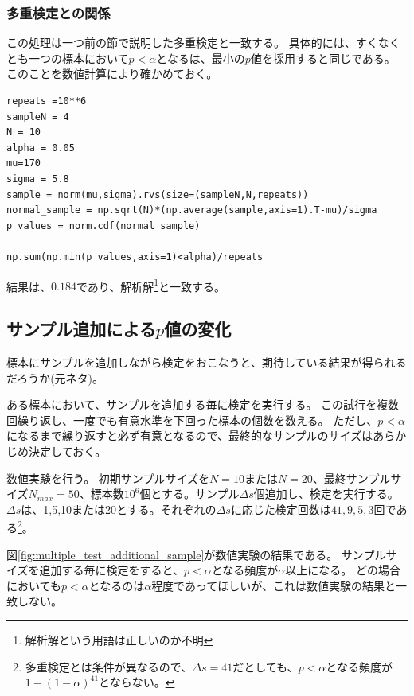 \subsubsection{多重検定との関係}
この処理は一つ前の節で説明した多重検定と一致する。
具体的には、すくなくとも一つの標本において$p<\alpha$となるは、最小の$p$値を採用すると同じである。
このことを数値計算により確かめておく。
\begin{lstlisting}
repeats =10**6
sampleN = 4
N = 10
alpha = 0.05
mu=170
sigma = 5.8
sample = norm(mu,sigma).rvs(size=(sampleN,N,repeats))
normal_sample = np.sqrt(N)*(np.average(sample,axis=1).T-mu)/sigma
p_values = norm.cdf(normal_sample)

np.sum(np.min(p_values,axis=1)<alpha)/repeats
\end{lstlisting}
結果は、$0.184$であり、解析解\footnote{解析解という用語は正しいのか不明}と一致する。



\subsection{サンプル追加による$p$値の変化}
標本にサンプルを追加しながら検定をおこなうと、期待している結果が得られるだろうか(元ネタ\cite{simmons2016false})。

ある標本において、サンプルを追加する毎に検定を実行する。
この試行を複数回繰り返し、一度でも有意水準を下回った標本の個数を数える。
ただし、$p<\alpha$になるまで繰り返すと必ず有意となるので、最終的なサンプルのサイズはあらかじめ決定しておく。

数値実験を行う。
初期サンプルサイズを$N=10$または$N=20$、最終サンプルサイズ$N_{max}=50$、標本数$10^6$個とする。サンプル$\Delta s$個追加し、検定を実行する。
$\Delta s$は、1,5,10または20とする。それぞれの$\Delta s$に応じた検定回数は$41,9,5,3$回である\footnote{多重検定とは条件が異なるので、$\Delta s=41$だとしても、$p<\alpha$となる頻度が$1-(1-\alpha)^{41}$とならない。}。


図\ref{fig:multiple_test_additional_sample}が数値実験の結果である。
サンプルサイズを追加する毎に検定をすると、$p<\alpha$となる頻度が$\alpha$以上になる。
どの場合においても$p<\alpha$となるのは$\alpha$程度であってほしいが、これは数値実験の結果と一致しない。

